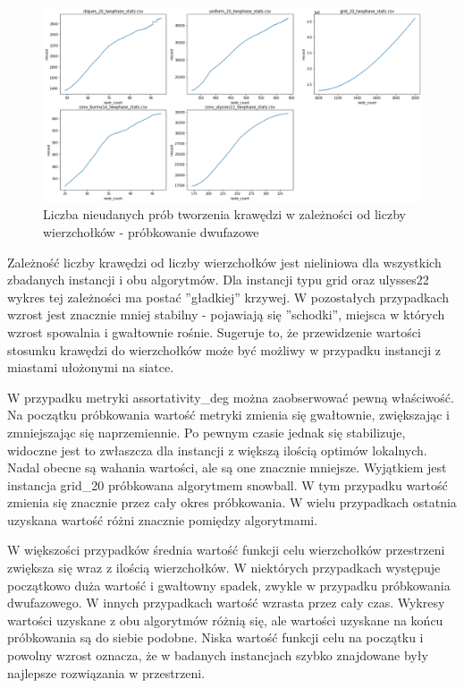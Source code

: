 \begin{figure}[h!]
    \centering
    \includegraphics[width=\textwidth]{chapters/experiments/img/merged_plots/per1_all/missed.png}
    \caption{Liczba nieudanych prób tworzenia krawędzi w zależności od liczby wierzchołków - próbkowanie dwufazowe}
    \label{fig:small_missed}
\end{figure}

Zależność liczby krawędzi od liczby wierzchołków jest nieliniowa dla wszystkich zbadanych instancji i obu algorytmów.
Dla instancji typu grid oraz ulysses22 wykres tej zależności ma postać ''gładkiej'' krzywej.
W pozostałych przypadkach wzrost jest znacznie mniej stabilny - pojawiają się ''schodki'', miejsca w których wzrost
spowalnia i gwałtownie rośnie.
Sugeruje to, że przewidzenie wartości stosunku krawędzi do wierzchołków może być możliwy w przypadku
instancji z miastami ułożonymi na siatce.

W przypadku metryki assortativity\_deg można zaobserwować pewną właściwość.
Na początku próbkowania wartość metryki zmienia się gwałtownie, zwiększając i zmniejszając się naprzemiennie.
Po pewnym czasie jednak się stabilizuje, widoczne jest to zwłaszcza dla instancji z większą ilością optimów lokalnych.
Nadal obecne są wahania wartości, ale są one znacznie mniejsze.
Wyjątkiem jest instancja grid\_20 próbkowana algorytmem snowball.
W tym przypadku wartość zmienia się znacznie przez cały okres próbkowania.
W wielu przypadkach ostatnia uzyskana wartość różni znacznie pomiędzy algorytmami.

W większości przypadków średnia wartość funkcji celu wierzchołków przestrzeni zwiększa się wraz z ilością wierzchołków.
W niektórych przypadkach występuje początkowo duża wartość i gwałtowny spadek, zwykle w przypadku próbkowania dwufazowego.
W innych przypadkach wartość wzrasta przez cały czas.
Wykresy wartości uzyskane z obu algorytmów różnią się, ale wartości uzyskane na końcu próbkowania są do siebie podobne.
Niska wartość funkcji celu na początku i powolny wzrost oznacza, że w badanych instancjach szybko znajdowane były
najlepsze rozwiązania w przestrzeni.

